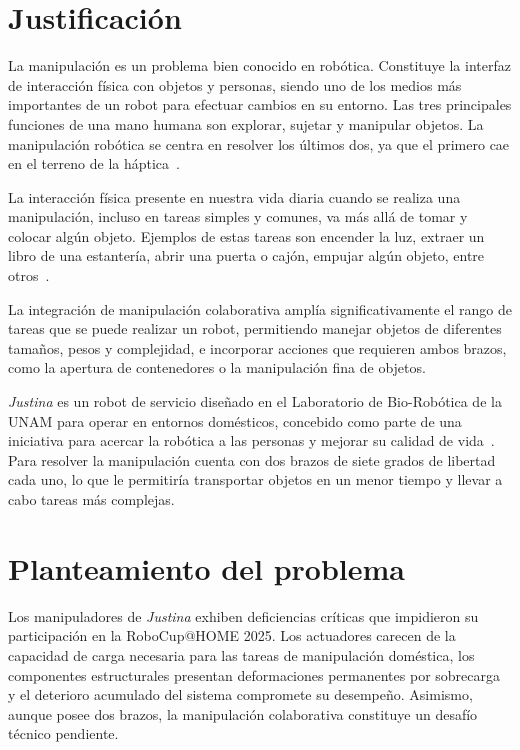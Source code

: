 \section{Justificación}

La manipulación es un problema bien conocido en robótica. Constituye la interfaz de interacción física con objetos y personas, siendo uno de los medios más importantes de un robot para efectuar cambios en su entorno. Las tres principales funciones de una mano humana son explorar, sujetar y manipular objetos. La manipulación robótica se centra en resolver los últimos dos, ya que el primero cae en el terreno de la háptica~\cite{bicchi_grasping}.

La interacción física presente en nuestra vida diaria cuando se realiza una manipulación, incluso en tareas simples y comunes, va más allá de tomar y colocar algún objeto. Ejemplos de estas tareas son encender la luz, extraer un libro de una estantería, abrir una puerta o cajón, empujar algún  objeto, entre otros~\cite{jaume2_manipulation}.

La integración de manipulación colaborativa amplía significativamente el rango de tareas que se puede realizar un robot, permitiendo manejar objetos de diferentes tamaños, pesos y complejidad, e incorporar acciones que requieren ambos brazos, como la apertura de contenedores o la manipulación fina de objetos.

\emph{Justina} es un robot de servicio diseñado en el Laboratorio de Bio-Robótica de la UNAM para operar en entornos domésticos, concebido como parte de una iniciativa para acercar la robótica a las personas y mejorar su calidad de vida~\cite{BioRoboticsUNAM}. Para resolver la manipulación cuenta con dos brazos de siete grados de libertad cada uno, lo que le permitiría transportar objetos en un menor tiempo y llevar a cabo tareas más complejas.

\section{Planteamiento del problema}

Los manipuladores de \emph{Justina} exhiben deficiencias críticas que impidieron su participación en la RoboCup@HOME 2025. Los actuadores carecen de la capacidad de carga necesaria para las tareas de manipulación doméstica, los componentes estructurales presentan deformaciones permanentes por sobrecarga y el deterioro acumulado del sistema compromete su desempeño. Asimismo, aunque posee dos brazos, la manipulación colaborativa constituye un desafío técnico pendiente.

